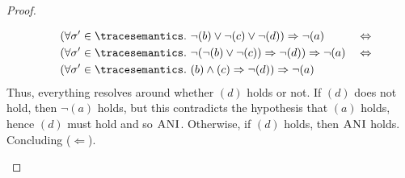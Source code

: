 \begin{proof}
\begin{enumerate}
\begin{align*}
      &\quad  (\forall \deftrace'\in\tracesemantics.\spacer \neg(b) \lor \neg(c) \lor \neg(d)) \implies \neg(a) && \iff \\
      &\quad  (\forall \deftrace'\in\tracesemantics.\spacer \neg(\neg(b) \lor \neg(c)) \implies \neg(d)) \implies \neg(a) && \iff \\
      &\quad  (\forall \deftrace'\in\tracesemantics.\spacer (b) \land (c) \implies \neg(d)) \implies \neg(a)
    \end{align*}
    Thus, everything resolves around whether $(d)$ holds or not.
    If $(d)$ does not hold, then $\neg(a)$ holds, but this contradicts the hypothesis that $(a)$ holds, hence $(d)$ must hold and so $\textup{\textsc{ANI}}$.
    Otherwise, if $(d)$ holds, then $\textup{\textsc{ANI}}$ holds.
    Concluding ($\Leftarrow$).
  \end{enumerate}

\end{proof}
